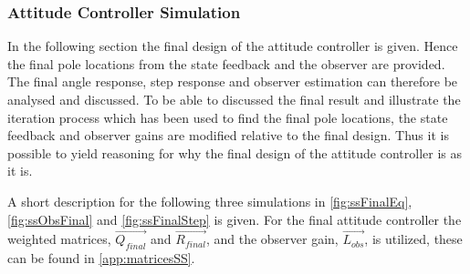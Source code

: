 \subsubsection{Attitude Controller Simulation}
In the following section the final design of the attitude controller is given. Hence the final pole locations from the state feedback and the observer are provided. The final angle response, step response and observer estimation can therefore be analysed and discussed. To be able to discussed the final result and illustrate the iteration process which has been used to find the final pole locations, the state feedback and observer gains are modified relative to the final design. Thus it is possible to yield reasoning for why the final design of the attitude controller is as it is.

A short description for the following three simulations in \autoref{fig:ssFinalEq}, \autoref{fig:ssObsFinal} and \autoref{fig:ssFinalStep} is given. For the final attitude controller the weighted matrices, $\vec{Q_{final}}$ and $\vec{R_{final}}$, and the observer gain, $\vec{L_{obs}}$, is utilized, these can be found in \autoref{app:matricesSS}.

